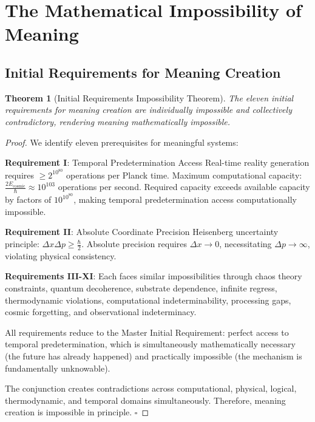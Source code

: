 \documentclass[12pt,a4paper]{article}
\newtheorem{theorem}{Theorem}[section]
\begin{document}
\section{The Mathematical Impossibility of Meaning}

\subsection{Initial Requirements for Meaning Creation}

\begin{theorem}[Initial Requirements Impossibility Theorem]
The eleven initial requirements for meaning creation are individually impossible and collectively contradictory, rendering meaning mathematically impossible.
\end{theorem}

\begin{proof}
We identify eleven prerequisites for meaningful systems:

\textbf{Requirement I}: Temporal Predetermination Access
Real-time reality generation requires $\geq 2^{10^{80}}$ operations per Planck time. Maximum computational capacity: $\frac{2E_{\text{cosmic}}}{\hbar} \approx 10^{103}$ operations per second. Required capacity exceeds available capacity by factors of $10^{10^{80}}$, making temporal predetermination access computationally impossible.

\textbf{Requirement II}: Absolute Coordinate Precision
Heisenberg uncertainty principle: $\Delta x \Delta p \geq \frac{\hbar}{2}$. Absolute precision requires $\Delta x \to 0$, necessitating $\Delta p \to \infty$, violating physical consistency.

\textbf{Requirements III-XI}: Each faces similar impossibilities through chaos theory constraints, quantum decoherence, substrate dependence, infinite regress, thermodynamic violations, computational indeterminability, processing gaps, cosmic forgetting, and observational indeterminacy.

All requirements reduce to the Master Initial Requirement: perfect access to temporal predetermination, which is simultaneously mathematically necessary (the future has already happened) and practically impossible (the mechanism is fundamentally unknowable).

The conjunction creates contradictions across computational, physical, logical, thermodynamic, and temporal domains simultaneously. Therefore, meaning creation is impossible in principle. $\square$
\end{proof}
\end{document}
